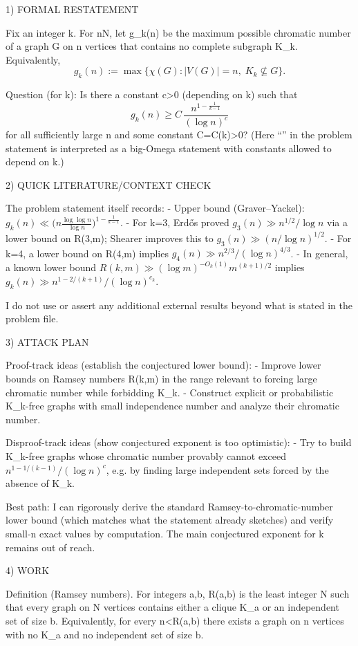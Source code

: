 
1) FORMAL RESTATEMENT

Fix an integer k.
For n\in\mathbb N, let g_k(n) be the maximum possible chromatic number of a graph G on n vertices that contains no complete subgraph K_k.
Equivalently,
\[g_k(n):=\max\{\chi(G): |V(G)|=n,\; K_k\not\subseteq G\}.\]

Question (for k): Is there a constant c>0 (depending on k) such that
\[ g_k(n) \ge C\, \frac{n^{1-\frac{1}{k-1}}}{(\log n)^c} \]
for all sufficiently large n and some constant C=C(k)>0?
(Here “\gg” in the problem statement is interpreted as a big-Omega statement with constants allowed to depend on k.)


2) QUICK LITERATURE/CONTEXT CHECK

The problem statement itself records:
- Upper bound (Graver–Yackel): \(g_k(n) \ll \big(n\frac{\log\log n}{\log n}\big)^{1-\frac{1}{k-1}}\).
- For k=3, Erd\H{o}s proved \(g_3(n) \gg n^{1/2}/\log n\) via a lower bound on R(3,m); Shearer improves this to \(g_3(n) \gg (n/\log n)^{1/2}\).
- For k=4, a lower bound on R(4,m) implies \(g_4(n) \gg n^{2/3}/(\log n)^{4/3}\).
- In general, a known lower bound \(R(k,m)\gg (\log m)^{-O_k(1)} m^{(k+1)/2}\) implies \(g_k(n)\gg n^{1-2/(k+1)}/(\log n)^{c_k}\).

I do not use or assert any additional external results beyond what is stated in the problem file.


3) ATTACK PLAN

Proof-track ideas (establish the conjectured lower bound):
- Improve lower bounds on Ramsey numbers R(k,m) in the range relevant to forcing large chromatic number while forbidding K_k.
- Construct explicit or probabilistic K_k-free graphs with small independence number and analyze their chromatic number.

Disproof-track ideas (show conjectured exponent is too optimistic):
- Try to build K_k-free graphs whose chromatic number provably cannot exceed \(n^{1-1/(k-1)}/(\log n)^c\), e.g. by finding large independent sets forced by the absence of K_k.

Best path: I can rigorously derive the standard Ramsey-to-chromatic-number lower bound (which matches what the statement already sketches) and verify small-n exact values by computation. The main conjectured exponent for k remains out of reach.


4) WORK

Definition (Ramsey numbers).
For integers a,b, R(a,b) is the least integer N such that every graph on N vertices contains either a clique K_a or an independent set of size b.
Equivalently, for every n<R(a,b) there exists a graph on n vertices with no K_a and no independent set of size b.

